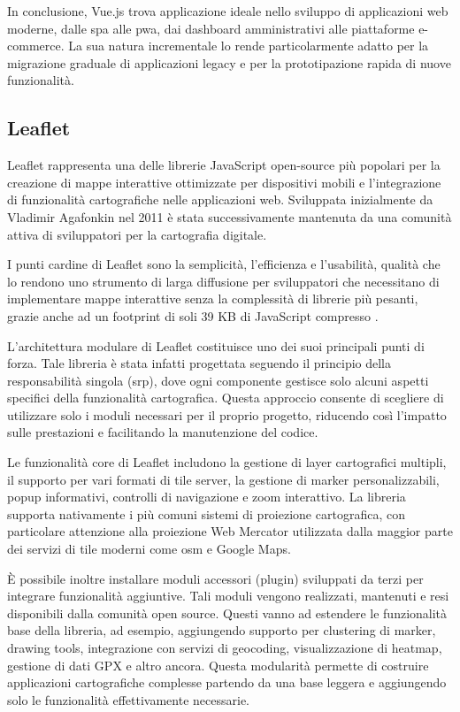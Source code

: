 In conclusione, Vue.js trova applicazione ideale nello sviluppo di applicazioni web moderne, dalle \acrfull{spa} alle
\acrfull{pwa}, dai dashboard amministrativi alle piattaforme e-commerce. La sua natura incrementale lo rende
particolarmente adatto per la migrazione graduale di applicazioni legacy e per la prototipazione rapida
di nuove funzionalità.

\subsection{Leaflet}

Leaflet rappresenta una delle librerie JavaScript open-source più popolari per la creazione di mappe interattive
ottimizzate per dispositivi mobili e l'integrazione di funzionalità cartografiche nelle applicazioni web.
Sviluppata inizialmente da Vladimir Agafonkin nel 2011 \cite{agafonkin2011leaflet} è stata successivamente mantenuta da
una comunità attiva di sviluppatori per la cartografia digitale.

I punti cardine di Leaflet sono la semplicità, l'efficienza e l'usabilità, qualità che lo rendono uno strumento di larga
diffusione per sviluppatori che necessitano di implementare mappe interattive senza la complessità di librerie più
pesanti, grazie anche ad un footprint di soli 39 KB di JavaScript compresso \cite{leafletnpm2024}.

L'architettura modulare di Leaflet costituisce uno dei suoi principali punti di forza. Tale libreria è stata infatti
progettata seguendo il principio della responsabilità singola (\acrshort{srp}), dove ogni componente gestisce
solo alcuni aspetti specifici della funzionalità cartografica. Questa approccio consente di scegliere di utilizzare
solo i moduli necessari per il proprio progetto, riducendo così l'impatto sulle prestazioni e
facilitando la manutenzione del codice.

Le funzionalità core di Leaflet includono la gestione di layer cartografici multipli, il supporto per vari formati di
tile server, la gestione di marker personalizzabili, popup informativi, controlli di navigazione e zoom interattivo.
La libreria supporta nativamente i più comuni sistemi di proiezione cartografica, con particolare attenzione alla
proiezione Web Mercator utilizzata dalla maggior parte dei servizi di tile moderni come \acrfull{osm} e Google Maps.

È possibile inoltre installare moduli accessori (plugin) sviluppati da terzi per integrare funzionalità aggiuntive.
Tali moduli vengono realizzati, mantenuti e resi disponibili dalla comunità open source. Questi vanno ad estendere le
funzionalità base della libreria, ad esempio, aggiungendo supporto per clustering di marker, drawing tools, integrazione
con servizi di geocoding, visualizzazione di heatmap, gestione di dati GPX e altro ancora. Questa modularità permette di
costruire applicazioni cartografiche complesse partendo da una base leggera e aggiungendo solo le funzionalità
effettivamente necessarie.

